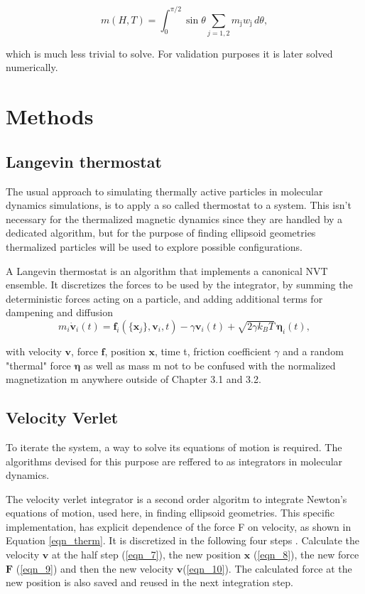 \documentclass[12pt, DIV=12]{scrartcl}
\begin{document}
\begin{equation}
    m(H,T) = \int_0^{\pi/2} \sin\theta \sum_{j=1,2}m_\mathrm{j}w_\mathrm{j} \,d\theta,
    \label{eqn_equil_rv}
\end{equation}

which is much less trivial to solve. For validation purposes it is later solved numerically.

\section{Methods}

\subsection{Langevin thermostat}
The usual approach to simulating thermally active particles in molecular dynamics simulations, is to apply a so called thermostat to a system. This isn't necessary for the thermalized magnetic dynamics since they are handled by a dedicated algorithm, but for the purpose of finding ellipsoid geometries thermalized particles will be used to explore possible configurations.

A Langevin thermostat \cite{Allen2017} is an algorithm that implements a canonical NVT ensemble. It discretizes the forces to be used by the integrator, by summing the deterministic forces acting on a particle, and adding additional terms for dampening and diffusion
\begin{equation}
    m_i \dot{\mathbf{v}}_i(t)
    = \mathbf{f}_i(\{\mathbf{x}_j\}, \mathbf{v}_i, t)
    - \gamma \mathbf{v}_i(t)
    + \sqrt{2\gamma k_B T}\,\boldsymbol{\eta}_i(t),
    \label{eqn_therm}
\end{equation}

with velocity $\mathbf{v}$, force $\mathbf{f}$, position $\mathbf{x}$, time t, friction coefficient $\gamma$ and a random "thermal" force $\mathbf{\eta}$ as well as mass m not to be confused with the normalized magnetization m anywhere outside of Chapter 3.1 and 3.2.

\subsection{Velocity Verlet}
To iterate the system, a way to solve its equations of motion is required. The algorithms devised for this purpose are reffered to as integrators in molecular dynamics.

The velocity verlet integrator \cite{Swope1982} is a second order algoritm to integrate Newton's equations of motion, used here, in finding ellipsoid geometries. This specific implementation, has explicit dependence of the force F on velocity, as shown in Equation \ref{eqn_therm}. It is discretized in the following four steps \cite{Rapaport2004}. Calculate the velocity $\mathbf{v}$ at the half step (\ref{eqn_7}), the new position $\mathbf{x}$ (\ref{eqn_8}), the new force $\mathbf{F}$ (\ref{eqn_9}) and then the new velocity $\mathbf{v}$(\ref{eqn_10}). The calculated force at the new position is also saved and reused in the next integration step.
\end{document}
